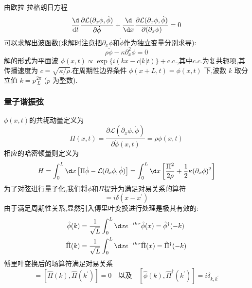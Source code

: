 由欧拉-拉格朗日方程
\begin{equation}
	\frac{\d}{\dt}\frac{\partial\mathcal{L}(\partial_x\phi,\dot{\phi})}{\partial\dot{\phi}}+\frac{\d}{\d x}\frac{\partial\mathcal{L}(\partial_x\phi,\dot{\phi})}{\partial(\partial_x\phi)}=0
\end{equation}
可以求解出波函数(求解时注意把$\partial_x\phi$和$\dot \phi$作为独立变量分别求导):
\begin{equation}
	\rho\ddot{\phi}-\kappa\partial_x^2\phi=0
\end{equation}
解的形式为平面波 $\phi(x,t) \propto \exp\{i(kx - c|k|t)\} + \text{c.c.}$,其中$c.c.$为复共轭项,其传播速度为 $c = \sqrt{\kappa/\rho}$.在周期性边界条件 $\phi(x+L,t) = \phi(x,t)$ 下,波数 $k$ 取分立值 $k = p\frac{2\pi}{L}$ ($p$ 为整数).

\subsubsection{量子谐振弦}
$\phi(x,t)$的共轭动量定义为
\begin{equation}
	\Pi(x,t)=\frac{\partial\mathcal{L}(\partial_x\phi,\dot{\phi})}{\partial\dot{\phi}(x,t)}=\rho\dot{\phi}(x,t)
\end{equation}
相应的哈密顿量则定义为
\begin{equation}
	H=\int_0^L\d x\left[\Pi\dot{\phi}-\mathcal{L}(\partial_x\phi,\dot{\phi})\right]=\int_0^L\d x\left[\frac{\Pi^2}{2\rho}+\frac{1}{2}\kappa(\partial_x\phi)^2\right]
\end{equation}
为了对弦进行量子化,我们将$\phi$和$\Pi$提升为满足对易关系的算符
\begin{equation}
	[\hat{\phi}(x),\hat{\Pi}(x^{\prime})]=i\delta(x-x^{\prime})
\end{equation}
由于满足周期性关系,显然引入傅里叶变换进行处理是极其有效的:
\begin{equation}
	\begin{aligned}
		\hat{\phi}(k)&=\frac{1}{\sqrt{L}}\int_0^L\d xe^{-ikx}\hat{\phi}(x)=\hat{\phi}^\dagger(-k)\\
		\hat{\Pi}(k)&=\frac{1}{\sqrt{L}}\int_0^L\d xe^{-ikx}\hat{\Pi}(x)=\hat{\Pi}^\dagger(-k)
	\end{aligned}
\end{equation}
傅里叶变换后的场算符满足对易关系
\begin{equation}
	[\hat{\phi}(k),\hat{\phi}(k^{\prime})]=[\hat{\Pi}(k),\hat{\Pi}(k^{\prime})]=0\quad\text{以及}\quad[\hat{\phi}(k),\hat{\Pi}^\dagger(k^{\prime})]=i\delta_{k,k^{\prime}}
\end{equation}

